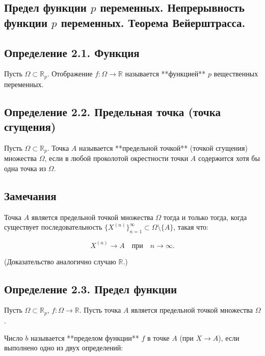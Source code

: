 {
\subsection{Предел функции \(p\) переменных. Непрерывность функции \(p\) переменных. Теорема Вейерштрасса.}


\subsection*{Определение 2.1. Функция  }

Пусть \( \Omega \subset \mathbb{R}_p \). Отображение \( f: \Omega \to \mathbb{R} \) называется **функцией** \( p \) вещественных переменных.

\subsection*{Определение 2.2. Предельная точка (точка сгущения)}  

Пусть \( \Omega \subset \mathbb{R}_p \). Точка \( A \) называется **предельной точкой** (точкой сгущения) множества \( \Omega \), если в любой проколотой окрестности точки \( A \) содержится хотя бы одна точка из \( \Omega \).

\subsection*{Замечания} 

Точка \( A \) является предельной точкой множества \( \Omega \) тогда и только тогда, когда существует последовательность \( \{X^{(n)}\}_{n=1}^{\infty} \subset \Omega \setminus \{A\} \), такая что:



\[
X^{(n)} \to A \quad \text{при} \quad n \to \infty.
\]



(Доказательство аналогично случаю \( \mathbb{R} \).)

\subsection*{Определение 2.3. Предел функции  }

Пусть \( \Omega \subset \mathbb{R}_p \), \( f: \Omega \to \mathbb{R} \). Пусть точка \( A \) является предельной точкой множества \( \Omega \).  

Число \( b \) называется **пределом функции** \( f \) в точке \( A \) (при \( X \to A \)), если выполнено одно из двух определений:  

}
